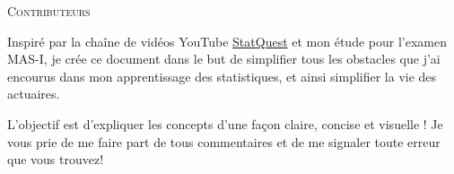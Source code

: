 \documentclass[french]{article}
\begin{document}
\begin{center}
	\textsc{\Large Contributeurs}\\[0.5cm] 
\end{center}


\begin{rappel_enhanced}[Motivation]
Inspiré par la chaîne de vidéos YouTube \href{https://www.youtube.com/user/joshstarmer}{\color{azure(colorwheel)}StatQuest} et mon étude pour l'examen MAS-I, je crée ce document dans le but de simplifier tous les obstacles que j'ai encourus dans mon apprentissage des statistiques, et ainsi simplifier la vie des actuaires.

\bigskip

L'objectif est d'expliquer les concepts d'une façon claire, concise et visuelle ! Je vous prie de me faire part de tous commentaires et de me signaler toute erreur que vous trouvez! 
\end{rappel_enhanced}
\end{document}
